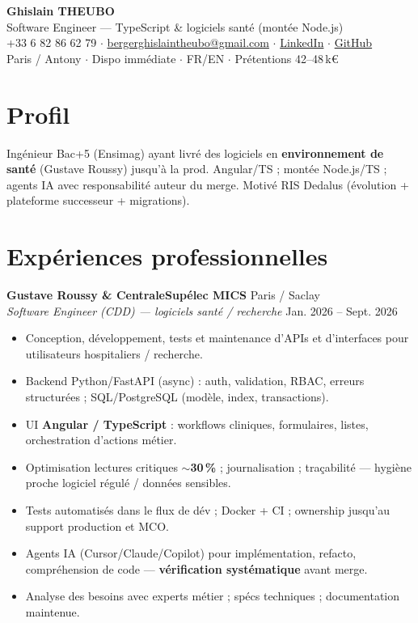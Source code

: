\documentclass[10pt,a4paper]{article}
\begin{document}
\begin{center}
{\LARGE\bfseries Ghislain THEUBO}\\[1pt]
{\large Software Engineer --- TypeScript \& logiciels sant\'e (mont\'ee Node.js)}\\[2pt]
+33 6 82 86 62 79 $\cdot$
\href{mailto:bergerghislaintheubo@gmail.com}{bergerghislaintheubo@gmail.com} $\cdot$
\href{https://www.linkedin.com/in/berger-ghislain}{LinkedIn} $\cdot$
\href{https://github.com/Bergerghislain}{GitHub}\\[1pt]
Paris / Antony $\cdot$ Dispo imm\'ediate $\cdot$ FR/EN $\cdot$ Pr\'etentions 42--48\,k€
\end{center}

\section{Profil}
Ing\'enieur Bac+5 (Ensimag) ayant livr\'e des logiciels en \textbf{environnement de sant\'e} (Gustave Roussy) jusqu'\`a la prod. Angular/TS ; mont\'ee Node.js/TS ; agents IA avec responsabilit\'e auteur du merge. Motiv\'e RIS Dedalus (\'evolution + plateforme successeur + migrations).

\section{Exp\'eriences professionnelles}
\textbf{Gustave Roussy \& CentraleSup\'elec MICS} \hfill Paris / Saclay\\
\textit{Software Engineer (CDD) --- logiciels sant\'e / recherche} \hfill Jan. 2026 -- Sept. 2026
\begin{itemize}
  \item Conception, d\'eveloppement, tests et maintenance d'APIs et d'interfaces pour utilisateurs hospitaliers / recherche.
  \item Backend Python/FastAPI (async) : auth, validation, RBAC, erreurs structur\'ees ; SQL/PostgreSQL (mod\`ele, index, transactions).
  \item UI \textbf{Angular / TypeScript} : workflows cliniques, formulaires, listes, orchestration d'actions m\'etier.
  \item Optimisation lectures critiques $\sim$\textbf{30\,\%} ; journalisation ; tra\c{c}abilit\'e --- hygi\`ene proche logiciel r\'egul\'e / donn\'ees sensibles.
  \item Tests automatis\'es dans le flux de d\'ev ; Docker + CI ; ownership jusqu'au support production et MCO.
  \item Agents IA (Cursor/Claude/Copilot) pour impl\'ementation, refacto, compr\'ehension de code --- \textbf{v\'erification syst\'ematique} avant merge.
  \item Analyse des besoins avec experts m\'etier ; sp\'ecs techniques ; documentation maintenue.
\end{itemize}
\end{document}
